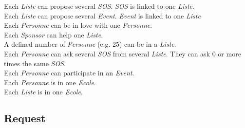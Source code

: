 \documentclass[a4paper,oneside,1pt]{article}
\begin{document}

Each \textit{Liste} can propose several \textit{SOS}. \textit{SOS} is linked to one \textit{Liste}. \\
Each \textit{Liste} can propose several \textit{Event}. \textit{Event} is linked to one \textit{Liste} \\
Each \textit{Personne} can be in love with one \textit{Personne}. \\
Each \textit{Sponsor} can help one \textit{Liste}. \\
A defined number of \textit{Personne} (e.g. 25) can be in a \textit{Liste}. \\
Each \textit{Personne} can ask several \textit{SOS} from several \textit{Liste}. They can ask 0 or more times the same \textit{SOS}. \\
Each \textit{Personne} can participate in an \textit{Event}. \\
Each \textit{Personne} is in one \textit{Ecole}. \\
Each \textit{Liste} is in one \textit{Ecole}. \\

\subsection{Request}

\end{document}

